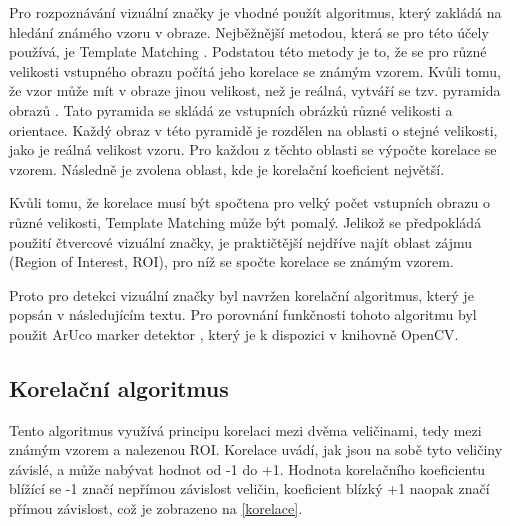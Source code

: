 \documentclass[twoside]{ctuthesis}
\theoremstyle{plain}
\theoremstyle{definition}
\theoremstyle{note}
\begin{document}
Pro rozpoznávání vizuální značky je vhodné použít algoritmus, který zakládá na hledání známého vzoru v obraze. Nejběžnější metodou, která se pro této účely používá, je Template Matching \cite{cite:16}. Podstatou této metody je to, že se pro různé velikosti vstupného obrazu počítá jeho korelace se známým vzorem. Kvůli tomu, že vzor může mít v obraze jinou velikost, než je reálná, vytváří se tzv. pyramida obrazů \cite{cite:17}. Tato pyramida se skládá ze vstupních obrázků různé velikosti a orientace. Každý obraz v této pyramidě je rozdělen na oblasti o stejné velikosti, jako je reálná velikost vzoru. Pro každou z těchto oblasti se výpočte korelace se vzorem. Následně je zvolena oblast, kde je korelační koeficient největší.

Kvůli tomu, že korelace musí být spočtena pro velký počet vstupních obrazu o různé velikosti, Template Matching může být pomalý. Jelikož se předpokládá použití čtvercové vizuální značky, je praktičtější nejdříve najít oblast zájmu (Region of Interest, ROI), pro níž se spočte korelace se známým vzorem.

Proto pro detekci vizuální značky byl navržen korelační algoritmus, který je popsán v následujícím textu. Pro porovnání funkčnosti tohoto algoritmu byl použit ArUco marker detektor  \cite{cite:7}, který je k dispozici v knihovně OpenCV.

\subsection{Korelační algoritmus}

Tento algoritmus využívá principu korelaci mezi dvěma veličinami, tedy mezi známým vzorem a nalezenou ROI. Korelace uvádí, jak jsou na sobě tyto veličiny závislé, a může nabývat hodnot od -1 do +1. Hodnota korelačního koeficientu blížící se -1 značí nepřímou závislost veličin, koeficient blízký +1 naopak značí přímou závislost, což je zobrazeno na \ref{korelace}.
\end{document}
